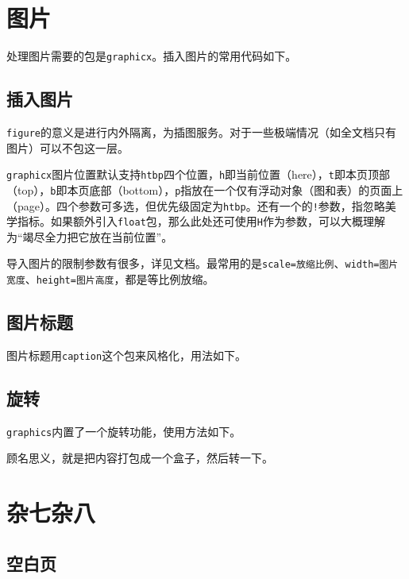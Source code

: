\documentclass[10pt,openany]{book}
\begin{document}
\chapter{图片}

处理图片需要的包是\texttt{graphicx}。插入图片的常用代码如下。

\section{插入图片}



\texttt{figure}的意义是进行内外隔离，为插图服务。对于一些极端情况（如全文档只有图片）可以不包这一层。

\texttt{graphicx}图片位置默认支持\texttt{htbp}四个位置，\texttt{h}即当前位置（here），\texttt{t}即本页顶部（top），\texttt{b}即本页底部（bottom），\texttt{p}指放在一个仅有浮动对象（图和表）的页面上（page）。四个参数可多选，但优先级固定为\texttt{htbp}。还有一个的\texttt{!}参数，指忽略美学指标。如果额外引入\texttt{float}包，那么此处还可使用\texttt{H}作为参数，可以大概理解为“竭尽全力把它放在当前位置”。

导入图片的限制参数有很多，详见文档。最常用的是\texttt{scale=放缩比例}、\texttt{width=图片宽度}、\texttt{height=图片高度}，都是等比例放缩。

\section{图片标题}

图片标题用\texttt{caption}这个包来风格化，用法如下。



\section{旋转}

\texttt{graphics}内置了一个旋转功能，使用方法如下。



顾名思义，就是把内容打包成一个盒子，然后转一下。

\chapter{杂七杂八}

\section{空白页}
\end{document}
